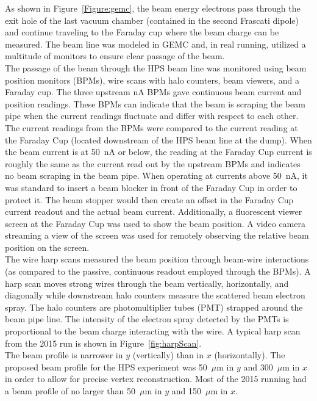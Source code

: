 \indent As shown in Figure~\ref{Figure:gemc}, the beam energy electrons pass through the exit hole of the last vacuum chamber (contained in the second Frascati dipole) and continue traveling to the Faraday cup where the beam charge can be measured. The beam line was modeled in GEMC and, in real running, utilized a multitude of monitors to ensure clear passage of the beam.\\
\indent The passage of the beam through the HPS beam line was monitored using beam position monitors (BPMs), wire scans with halo counters, beam viewers, and a Faraday cup. The three upstream nA BPMs gave continuous beam current and position readings. These BPMs can indicate that the beam is scraping the beam pipe when the current readings fluctuate and differ with respect to each other. The current readings from the BPMs were compared to the current reading at the Faraday Cup (located downstream of the HPS beam line at the dump). When the beam current is at 50~nA or below, the reading at the Faraday Cup current is roughly the same as the current read out by the upstream BPMs and indicates no beam scraping in the beam pipe. When operating at currents above 50~nA, it was standard to insert a beam blocker in front of the Faraday Cup in order to protect it. The beam stopper would then create an offset in the Faraday Cup current readout and the actual beam current. Additionally, a fluorescent viewer screen at the Faraday Cup was used to show the beam position.  A video camera streaming a view of the screen was used for remotely observing the relative beam position on the screen. \\ 
\indent The wire harp scans measured the beam position through beam-wire interactions (as compared to the passive, continuous readout employed through the BPMs). A harp scan moves strong wires through the beam vertically, horizontally, and diagonally while  downstream halo counters measure the scattered beam electron spray. The halo counters are photomultiplier tubes (PMT) strapped around the beam pipe line. The intensity of the electron spray detected by the PMTs is proportional to the beam charge interacting with the wire. A typical harp scan from the 2015 run is shown in Figure~\ref{fig:harpScan}.\\
\indent The beam profile is narrower in $y$ (vertically) than in $x$ (horizontally). The proposed beam profile for the HPS experiment was 50~$\mu$m in $y$ and 300~$\mu$m in $x$ in order to allow for precise vertex reconstruction. Most of the 2015 running had a beam profile of no larger than 50~$\mu$m in $y$ and 150~$\mu$m in $x$. 


